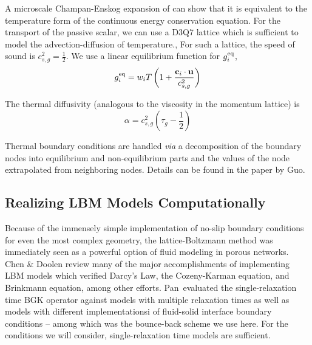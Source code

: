 A microscale Champan-Enskog expansion of  can show that it is equivalent to the temperature form of the continuous energy conservation equation.\cite{Guo2002} For the transport of the passive scalar, we can use a D3Q7 lattice which is sufficient to model the advection-diffusion of temperature.\cite{Latt2007,Parmigiani2011}, For such a lattice, the speed of sound is $c^2_{s,g} = \frac{1}{2}$. We use a linear equilibrium function for $g_i^{\text{eq}}$,
\begin{equation}
	g_i^{\text{eq}} = w_i T \left(1+\frac{\mathbf{c}_i\cdot\mathbf{u}}{c_{s,g}^2}\right)
\end{equation}

The thermal diffusivity (analogous to the viscosity in the momentum lattice) is 
\begin{equation}
	\alpha = c_{s,g}^2\left(\tau_{g} - \frac{1}{2}\right)
\end{equation}

Thermal boundary conditions are handled \textit{via} a decomposition of the boundary nodes into equilibrium and non-equilibrium parts and the values of the node extrapolated from neighboring nodes. Details can be found in the paper by Guo\etal.\cite{Guo2002}


\subsection{Realizing LBM Models Computationally}
Because of the immensely simple implementation of no-slip boundary conditions for even the most complex geometry, the lattice-Boltzmann method was immediately seen as a powerful option of fluid modeling in porous networks. Chen \& Doolen review many of the major accomplishments of implementing LBM models which verified Darcy's Law, the Cozeny-Karman equation, and Brinkmann equation, among other efforts.\cite{Chen1998a} Pan\etal~evaluated the single-relaxation time BGK operator against models with multiple relaxation times as well as models with different implementationsi of fluid-solid interface boundary conditions -- among which was the bounce-back scheme we use here.\cite{Pan2006} For the conditions we will consider, single-relaxation time models are sufficient.


